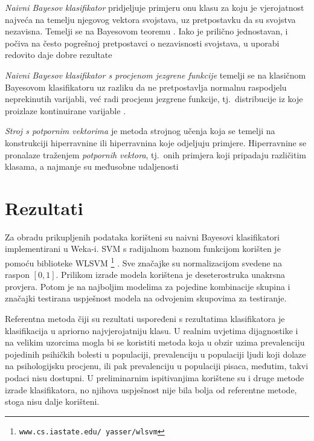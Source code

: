 \documentclass[10pt, a4paper]{article}
\begin{document}
\emph{Naivni Bayesov klasifikator} pridjeljuje primjeru onu klasu za koju je vjerojatnost najveća na temelju njegovog vektora svojstava, uz pretpostavku da su svojstva nezavisna. Temelji se na Bayesovom teoremu \citep{bayes-63}. Iako je prilično jednostavan, i počiva na često pogrešnoj pretpostavci o nezavisnosti svojstava, u uporabi redovito daje dobre rezultate \citep{hand-yu}

\emph{Naivni Bayesov klasifikator s procjenom jezgrene funkcije} temelji se na klasičnom Bayesovom klasifikatoru uz razliku da ne pretpostavlja normalnu raspodjelu neprekinutih varijabli, već radi procjenu jezgrene funkcije, tj.~distribucije iz koje proizlaze kontinuirane varijable \citep{john-95}.

\emph{Stroj s potpornim vektorima}  je metoda strojnog učenja koja se temelji na konstrukciji hiperravnine ili hiperravnina koje odjeljuju primjere. Hiperravnine se pronalaze traženjem \emph{potpornih vektora}, tj.~onih primjera koji pripadaju različitim klasama, a najmanje su međusobne udaljenosti \citep{cortes-vap}



\section{Rezultati}


 
Za obradu prikupljenih podataka korišteni su naivni Bayesovi klasifikatori implementirani u Weka-i. SVM s radijalnom baznom funkcijom korišten je pomoću biblioteke WLSVM \footnote{\texttt{www.cs.iastate.edu/~yasser/wlsvm}} \citep{yh05}. Sve značajke su normalizacijom svedene na raspon $[0,1]$. Prilikom izrade modela korištena je deseterostruka unakrsna provjera. Potom je na najboljim modelima za pojedine kombinacije skupina i značajki testirana uspješnost modela na odvojenim skupovima za testiranje.

Referentna metoda čiji su rezultati uspoređeni s rezultatima klasifikatora je klasifikacija u apriorno najvjerojatniju klasu. U realnim uvjetima dijagnostike i na velikim uzorcima mogla bi se koristiti metoda koja u obzir uzima prevalenciju pojedinih psihičkih bolesti u populaciji, prevalenciju u populaciji ljudi koji dolaze na psihologijsku procjenu, ili pak prevalenciju u populaciji pisaca, međutim, takvi podaci nisu dostupni. U preliminarnim ispitivanjima korištene su i druge metode izrade klasifikatora, no njihova uspješnost nije bila bolja od referentne metode, stoga nisu dalje korišteni.
\end{document}
